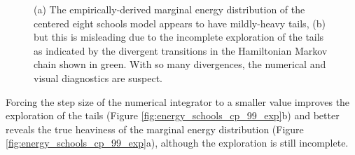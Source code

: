 \documentclass[stslayout]{imsart}
\begin{document}
\begin{figure}
\centering
{}
\caption{(a) The empirically-derived marginal energy distribution of the
centered eight schools model appears to have mildly-heavy tails,
(b) but this is misleading due to the incomplete exploration of the
tails as indicated by the divergent transitions in the Hamiltonian Markov 
chain shown in green.  With so many divergences, the numerical and visual
diagnostics are suspect.}
\label{fig:energy_schools_cp_exp}
\end{figure}

Forcing the step size of the numerical integrator to a smaller value
improves the exploration of the tails (Figure \ref{fig:energy_schools_cp_99_exp}b)
and better reveals the true heaviness of the marginal energy distribution
(Figure \ref{fig:energy_schools_cp_99_exp}a), although the exploration
is still incomplete.
\end{document}
